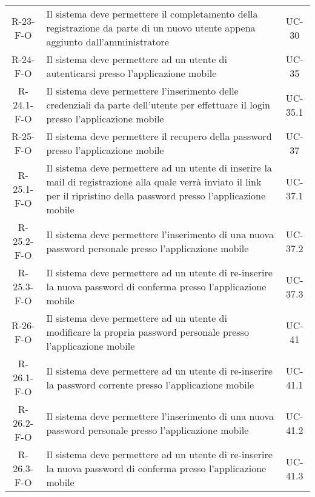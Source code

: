 \begin{longtable}{ c C{9cm} c }
    R-23-F-O & Il sistema deve permettere il completamento della registrazione da parte di un nuovo utente appena aggiunto dall'amministratore& UC- 30\\
    R-24-F-O & Il sistema deve permettere ad un utente di autenticarsi presso l'applicazione mobile& UC-35\\
    R-24.1-F-O & Il sistema deve permettere l'inserimento delle credenziali da parte dell'utente per effettuare il login presso l'applicazione mobile& UC-35.1\\
    R-25-F-O & Il sistema deve permettere il recupero della password presso l'applicazione mobile& UC-37\\
    R-25.1-F-O & Il sistema deve permettere ad un utente di inserire la mail di registrazione alla quale verrà inviato il link per il ripristino della password presso l'applicazione mobile& UC-37.1\\
    R-25.2-F-O & Il sistema deve permettere l'inserimento di una nuova password personale presso l'applicazione mobile& UC-37.2\\
    R-25.3-F-O & Il sistema deve permettere ad un utente di re-inserire la nuova password di conferma presso l'applicazione mobile& UC-37.3\\
    R-26-F-O & Il sistema deve permettere ad un utente di modificare la propria password personale presso l'applicazione mobile& UC-41\\
    R-26.1-F-O & Il sistema deve permettere ad un utente di re-inserire la password corrente presso l'applicazione mobile& UC-41.1\\
    R-26.2-F-O & Il sistema deve permettere l'inserimento di una nuova password personale presso l'applicazione mobile& UC-41.2\\
    R-26.3-F-O & Il sistema deve permettere ad un utente di re-inserire la nuova password di conferma presso l'applicazione mobile& UC-41.3\\










    
    

\end{longtable}
